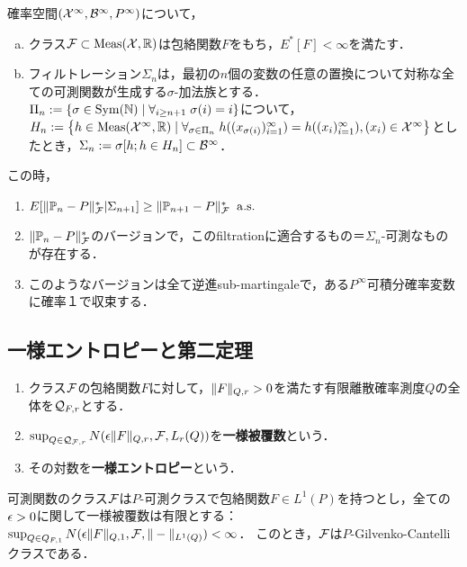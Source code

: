 \documentclass[uplatex,dvipdfmx]{jsreport}
\begin{document}
\begin{lemma}\label{lemma-for-Gilvenko-Cantelli-1}
    確率空間$(\mathcal{X}^\infty,\mathcal{B}^\infty,P^\infty)$について，
    \begin{enumerate}[(a)]
        \item クラス$\mathcal{F}\subset\mathrm{Meas}(\mathcal{X},\mathbb{R})$は包絡関数$F$をもち，$E^*[F]<\infty$を満たす．
        \item フィルトレーション$\Sigma_n$は，最初の$n$個の変数の任意の置換について対称な全ての可測関数が生成する$\sigma$-加法族とする．
        $\Pi_n:=\left\{\sigma\in\mathrm{Sym}(\mathbb{N})\mid\forall_{i\ge n+1}\;\sigma(i)=i\right\}$について，$H_n:=\left\{h\in\mathrm{Meas}(\mathcal{X}^\infty,\mathbb{R})\mid\forall_{\sigma\in\Pi_n}\;h((x_{\sigma(i)})^\infty_{i=1})=h((x_i)_{i=1}^\infty),(x_i)\in\mathcal{X}^\infty\right\}$としたとき，$\Sigma_n:=\sigma[h;h\in H_n]\subset\mathcal{B}^\infty$．
    \end{enumerate}
    この時，
    \begin{enumerate}
        \item $E[\|\mathbb{P}_n-P\|^*_{\mathcal{F}}|\Sigma_{n+1}]\ge\|\mathbb{P}_{n+1}-P\|^*_{\mathcal{F}}\;\;\mathrm{a.s.}$
        \item $\|\mathbb{P}_n-P\|^*_{\mathcal{F}}$のバージョンで，このfiltrationに適合するもの＝$\Sigma_n$-可測なものが存在する．
        \item このようなバージョンは全て逆進sub-martingaleで，ある$P^\infty$可積分確率変数に確率１で収束する．
    \end{enumerate}
\end{lemma}


\subsection{一様エントロピーと第二定理}

\begin{definition}\mbox{}
    \begin{enumerate}
        \item クラス$\mathcal{F}$の包絡関数$F$に対して，$\|F\|_{Q,r}>0$を満たす有限離散確率測度$Q$の全体を$\mathcal{Q}_{F,r}$とする．
        \item $\sup_{Q\in\mathcal{Q}_{\mathcal{F},r}}N(\epsilon\|F\|_{Q,r},\mathcal{F},L_r(Q))$を\textbf{一様被覆数}という．
        \item その対数を\textbf{一様エントロピー}という．
    \end{enumerate}
\end{definition}

\begin{theorem}\label{thm-Glivenko-Cantelli-2}
    可測関数のクラス$\mathcal{F}$は$P$-可測クラスで包絡関数$F\in L^1(P)$を持つとし，全ての$\epsilon>0$に関して一様被覆数は有限とする：$\sup_{Q\in Q_{F,1}}N(\epsilon\|F\|_{Q,1},\mathcal{F},\|-\|_{L^1(Q)})<\infty$．
    このとき，$\mathcal{F}$は$P$-Gilvenko-Cantelliクラスである．
\end{theorem}
\end{document}
